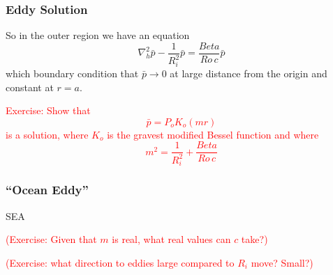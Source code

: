 \documentclass[xcolor=dvipsnames]{beamer}
\begin{document}
\begin{frame}
\frametitle{Eddy Solution}

So in the outer region we have an equation
\[ \nabla_h^2 \bar{p} - \frac{1}{R_i^2}\bar{p} = \frac{Beta}{Ro\, c} \bar{p}\]
which boundary condition that $\bar p \rightarrow 0$ at large distance from the origin and constant at $r = a$.

\textcolor{red}{Exercise: Show that 
\[ \bar{p} =P_o K_o (mr) \]
is a solution, where $K_o$ is the gravest modified Bessel function and where
\[ m^2 = \frac{1}{R_i^2} + \frac{Beta}{Ro\, c}\]}

\end{frame}

\begin{frame}
\frametitle{``Ocean Eddy''}

SEA

\textcolor{red}{(Exercise: Given that $m$ is real, what real values can $c$ take?)}

\textcolor{red}{(Exercise: what direction to eddies large compared to $R_i$ move?  Small?)}
\end{frame}
\end{document}
